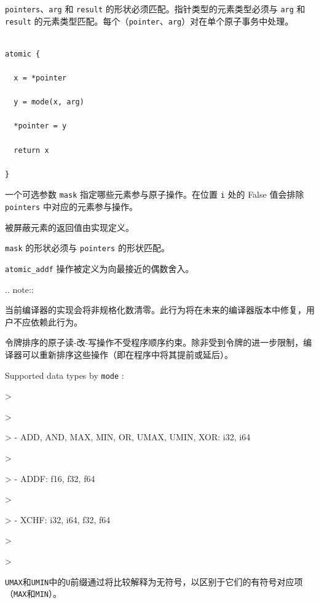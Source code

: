 \documentclass{article}
\begin{document}
\texttt{pointers}、\texttt{arg} 和 \texttt{result} 的形状必须匹配。指针类型的元素类型必须与 \texttt{arg} 和 \texttt{result} 的元素类型匹配。每个（\texttt{pointer}、\texttt{arg}）对在单个原子事务中处理。



\begin{lstlisting}

atomic {

  x = *pointer

  y = mode(x, arg)

  *pointer = y

  return x

}

\end{lstlisting}



一个可选参数 \texttt{mask} 指定哪些元素参与原子操作。在位置 \texttt{i} 处的 False 值会排除 \texttt{pointers} 中对应的元素参与操作。

被屏蔽元素的返回值由实现定义。

\texttt{mask} 的形状必须与 \texttt{pointers} 的形状匹配。



\texttt{atomic\_addf} 操作被定义为向最接近的偶数舍入。

.. note::


当前编译器的实现会将非规格化数清零。此行为将在未来的编译器版本中修复，用户不应依赖此行为。



令牌排序的原子读-改-写操作不受程序顺序约束。除非受到令牌的进一步限制，编译器可以重新排序这些操作（即在程序中将其提前或延后）。



Supported data types by \texttt{mode} :




> 


> 


> - ADD, AND, MAX, MIN, OR, UMAX, UMIN, XOR: i32, i64

> 


> - ADDF: f16, f32, f64


> 


> - XCHF: i32, i64, f32, f64


> 


> 




\texttt{UMAX}和\texttt{UMIN}中的\texttt{U}前缀通过将比较解释为无符号，以区别于它们的有符号对应项（\texttt{MAX}和\texttt{MIN}）。
\end{document}
